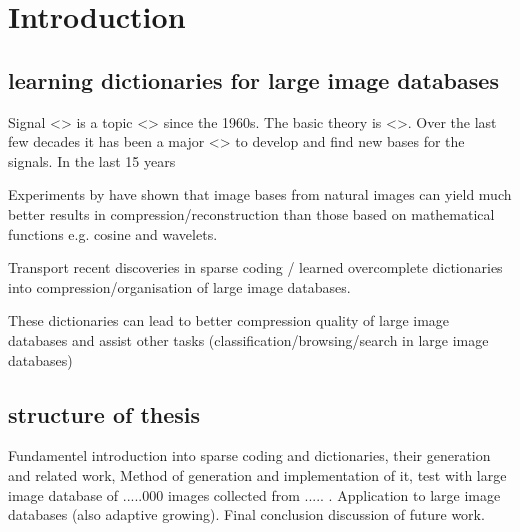 \chapter{Introduction}
\label{sec:introduction}
\section{learning dictionaries for large image databases}
Signal <> is a topic <> since the 1960s. The basic theory is <>. Over the last few decades it has been
a major <> to develop and find new bases for the signals. In the last 15 years 


Experiments by \cite{} have shown \cite{} that image bases from natural images can yield much better results in compression/reconstruction than
those based on mathematical functions e.g. cosine and wavelets.


\cite{Mairal2010}

Transport recent discoveries in sparse coding / learned overcomplete dictionaries into compression/organisation
of large image databases.

These dictionaries can lead to better compression quality of large image databases and assist other tasks (classification/browsing/search in large image databases)

\section{structure of thesis}
Fundamentel introduction into sparse coding and dictionaries, their generation and related work,
Method of generation and implementation of it, test with large image database of .....000 images collected from ..... .
Application to large image databases (also adaptive growing). Final conclusion discussion of future work. 


